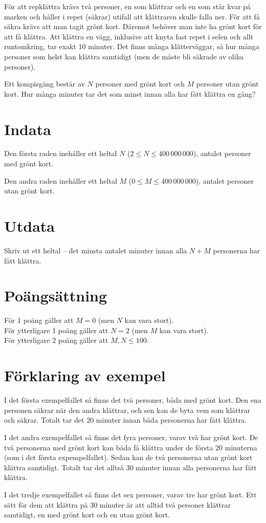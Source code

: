 För att repklättra krävs två personer, en som klättrar och en som står kvar på marken och håller i repet (säkrar) utifall att klättraren skulle falla ner.
För att få säkra krävs att man tagit grönt kort.
Däremot behöver man inte ha grönt kort för att få klättra.
Att klättra en vägg, inklusive att knyta fast repet i selen och allt runtomkring, tar exakt $10$ minuter.
Det finns många klätterväggar, så hur många personer som helst kan klättra samtidigt (men de måste bli säkrade av olika personer).

Ett kompisgäng består av $N$ personer med grönt kort och $M$ personer utan grönt kort. Hur många minuter tar det som minst innan alla har fått klättra en gång?

\section*{Indata}
Den första raden inehåller ett heltal $N$ ($2 \le N \le 400\,000\,000$), antalet personer med grönt kort.

Den andra raden inehåller ett heltal $M$ ($0 \le M \le 400\,000\,000$), antalet personer utan grönt kort.


\section*{Utdata}
Skriv ut ett heltal -- det minsta antalet minuter innan alla $N+M$ personerna har fått klättra.

\section*{Poängsättning}
För 1 poäng gäller att $M = 0$ (men $N$ kan vara stort).\\
För ytterligare 1 poäng gäller att $N = 2$ (men $M$ kan vara stort).\\
För ytterligare 2 poäng gäller att $M,N \le 100$.

\section*{Förklaring av exempel}
I det första exempelfallet så finns det två personer, båda med grönt kort.
Den ena personen säkrar när den andra klättrar, och sen kan de byta vem som klättrar och säkrar. 
Totalt tar det $20$ minuter innan båda personerna har fått klättra.

I det andra exempelfallet så finns det fyra personer, varav två har grönt kort.
De två personerna med grönt kort kan båda få klättra under de första $20$ minuterna (som i det första expempelfallet).
Sedan kan de två personerna utan grönt kort klättra samtidigt.
Totalt tar det alltså $30$ minuter innan alla personerna har fått klättra.

I det tredje exempelfallet så finns det sex personer, varav tre har grönt kort.
Ett sätt för dem att klättra på $30$ minuter är att alltid två personer klättrar samtidigt, en med grönt kort och en utan grönt kort.
